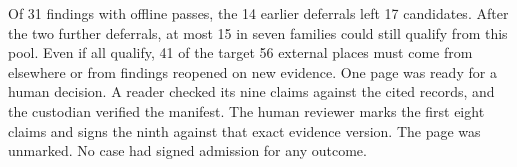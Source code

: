 Of 31 findings with offline passes, the 14 earlier deferrals left 17 candidates. After the two further deferrals, at most 15 in seven families could still qualify from this pool. Even if all qualify, 41 of the target 56 external places must come from elsewhere or from findings reopened on new evidence. One page was ready for a human decision. A reader checked its nine claims against the cited records, and the custodian verified the manifest. The human reviewer marks the first eight claims and signs the ninth against that exact evidence version. The page was unmarked. No case had signed admission for any outcome.
